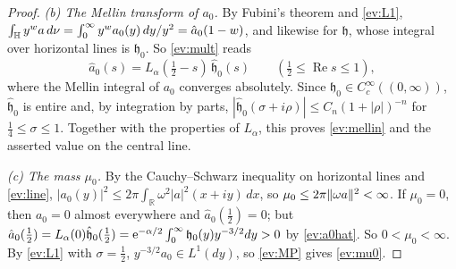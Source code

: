 \begin{proof}
\emph{(b) The Mellin transform of $a_0$.} By Fubini's theorem and \eqref{ev:L1}, $\int_{\mathbb{H}} y^wa\,d\nu=\int_0^\infty y^wa_0(y)\,dy/y^2=\hat a_0(1-w)$, and likewise for $\mathfrak h$, whose integral over
horizontal lines is $\mathfrak h_0$. So \eqref{ev:mult} reads
\begin{equation}\label{ev:a0hat}
  \hat a_0(s)=L_\alpha(\tfrac12-s)\,\hat{\mathfrak h}_0(s)\qquad(\tfrac12\le\operatorname{Re}s\le1),
\end{equation}
where the Mellin integral of $a_0$ converges absolutely. Since $\mathfrak h_0\in C_c^\infty((0,\infty))$, $\hat{\mathfrak h}_0$ is entire and, by integration by parts,
$|\hat{\mathfrak h}_0(\sigma+i\rho)|\le C_n(1+|\rho|)^{-n}$ for $\tfrac14\le\sigma\le1$.
Together with the properties of $L_\alpha$, this proves \eqref{ev:mellin} and the asserted value on the central line.

\emph{(c) The mass $\mu_0$.} By the Cauchy--Schwarz inequality on horizontal lines and \eqref{ev:line},
$|a_0(y)|^2\le2\pi\int_{\mathbb R}\omega^2|a|^2(x+iy)\,dx$, so $\mu_0\le2\pi\lVert \omega a\rVert^2<\infty$. If $\mu_0=0$, then $a_0=0$ almost everywhere and
$\hat a_0(\tfrac12)=0$; but $\hat a_0(\tfrac12)=L_\alpha(0)\hat{\mathfrak h}_0(\tfrac12)=\mathrm{e}^{-\alpha/2}\int_0^\infty \mathfrak h_0(y)y^{-3/2}dy>0$ by \eqref{ev:a0hat}. So $0<\mu_0<\infty$. By \eqref{ev:L1}
with $\sigma=\tfrac12$, $y^{-3/2}a_0\in L^1(dy)$, so \eqref{ev:MP} gives \eqref{ev:mu0}.


\end{proof}


